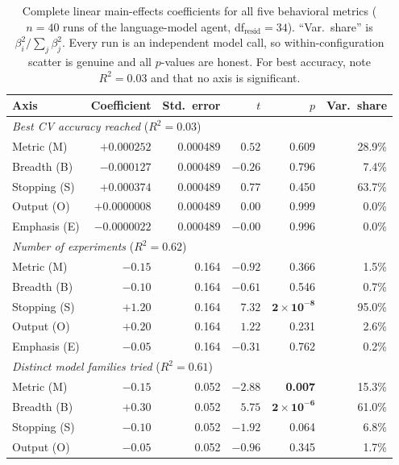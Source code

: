 \documentclass[11pt]{article}
\begin{document}
\begin{table}[htbp]
\centering
\small
\caption{Complete linear main-effects coefficients for all five behavioral metrics ($n=40$ runs of the language-model agent, df$_{\text{resid}}=34$). ``Var.\ share'' is $\beta_i^2/\sum_j\beta_j^2$. Every run is an independent model call, so within-configuration scatter is genuine and all $p$-values are honest. For best accuracy, note $R^2=0.03$ and that no axis is significant.}
\label{tab:appendix-coef}
\begin{tabular}{lrrrr r}
\toprule
Axis & Coefficient & Std.\ error & $t$ & $p$ & Var.\ share \\
\midrule
\multicolumn{6}{l}{\textit{Best CV accuracy reached} \quad ($R^2=0.03$)}\\
\quad Metric (M)        & $+0.000252$  & 0.000489 & $0.52$  & 0.609 & 28.9\% \\
\quad Breadth (B)       & $-0.000127$  & 0.000489 & $-0.26$ & 0.796 & 7.4\% \\
\quad Stopping (S)      & $+0.000374$  & 0.000489 & $0.77$  & 0.450 & 63.7\% \\
\quad Output (O)        & $+0.0000008$ & 0.000489 & $0.00$  & 0.999 & 0.0\% \\
\quad Emphasis (E)      & $-0.0000022$ & 0.000489 & $-0.00$ & 0.996 & 0.0\% \\
\midrule
\multicolumn{6}{l}{\textit{Number of experiments} \quad ($R^2=0.62$)}\\
\quad Metric (M)        & $-0.15$ & 0.164 & $-0.92$ & 0.366 & 1.5\% \\
\quad Breadth (B)       & $-0.10$ & 0.164 & $-0.61$ & 0.546 & 0.7\% \\
\quad Stopping (S)      & $+1.20$ & 0.164 & $7.32$  & $\mathbf{2\times10^{-8}}$ & 95.0\% \\
\quad Output (O)        & $+0.20$ & 0.164 & $1.22$  & 0.231 & 2.6\% \\
\quad Emphasis (E)      & $-0.05$ & 0.164 & $-0.31$ & 0.762 & 0.2\% \\
\midrule
\multicolumn{6}{l}{\textit{Distinct model families tried} \quad ($R^2=0.61$)}\\
\quad Metric (M)        & $-0.15$ & 0.052 & $-2.88$ & \textbf{0.007} & 15.3\% \\
\quad Breadth (B)       & $+0.30$ & 0.052 & $5.75$  & $\mathbf{2\times10^{-6}}$ & 61.0\% \\
\quad Stopping (S)      & $-0.10$ & 0.052 & $-1.92$ & 0.064 & 6.8\% \\
\quad Output (O)        & $-0.05$ & 0.052 & $-0.96$ & 0.345 & 1.7\% \\

\end{tabular}
\end{table}
\end{document}
